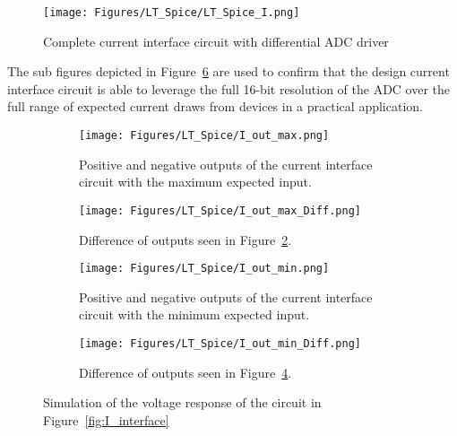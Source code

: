 \begin{figure}[H]
    \centering
    \texttt{[image: Figures/LT\_Spice/LT\_Spice\_I.png]}
    \caption{Complete current interface circuit with differential ADC driver}
    \label{fig:LT_Diagram_I}
\end{figure}

The sub figures depicted in Figure~\ref{fig:I_driver_simulation} are used to confirm that the design current interface circuit is able to leverage the full 16-bit resolution of the ADC over the full range of expected current draws from devices in a practical application.

\begin{figure}[H]
     \centering
     \begin{subfigure}[b]{0.4\textwidth}
        \centering
        \texttt{[image: Figures/LT\_Spice/I\_out\_max.png]}
        \caption{Positive and negative outputs of the current interface circuit with the maximum expected input.}
        \label{fig:I_out_max}
     \end{subfigure}
     \hfill
     \begin{subfigure}[b]{0.4\textwidth}
        \centering
        \texttt{[image: Figures/LT\_Spice/I\_out\_max\_Diff.png]}
        \caption{Difference of outputs seen in Figure~\ref{fig:I_out_max}.}
        \label{fig:I_diff_max}
    \end{subfigure}
    \hfill
     \begin{subfigure}[b]{0.4\textwidth}
        \centering
        \texttt{[image: Figures/LT\_Spice/I\_out\_min.png]}
        \caption{Positive and negative outputs of the current interface circuit with the minimum expected input.}
        \label{fig:I_out_min}
    \end{subfigure}
    \hfill
     \begin{subfigure}[b]{0.4\textwidth}
        \centering
        \texttt{[image: Figures/LT\_Spice/I\_out\_min\_Diff.png]}
        \caption{Difference of outputs seen in Figure~\ref{fig:I_out_min}.}
        \label{fig:I_diff_min}
    \end{subfigure}
    \caption{Simulation of the voltage response of the circuit in Figure~\ref{fig:I_interface}}
    \label{fig:I_driver_simulation}
\end{figure}

